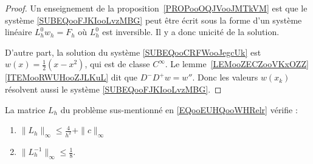\begin{proof}
    Un enseignement de la proposition~\ref{PROPooOQJVooJMTkVM} est que le système \eqref{SUBEQooFJKIooLvzMBG} peut être écrit sous la forme d'un système linéaire \( L^0_hw_h=F_h\) où \( L_h^0\) est inversible. Il y a donc unicité de la solution.

    D'autre part, la solution du système \eqref{SUBEQooCRFWooJegcUk} est \( w(x)=\frac{ 1 }{2}(x-x^2)\), qui est de classe \(  C^{\infty}\). Le lemme~\ref{LEMooZECZooVKxOZZ}\ref{ITEMooRWUHooZJLKuL} dit que \( D^-D^+w=w''\). Donc les valeurs \( w(x_k)\) résolvent aussi le système \eqref{SUBEQooFJKIooLvzMBG}.
\end{proof}

\begin{lemma}
    La matrice \( L_h\) du problème sus-mentionné en \eqref{EQooEUHQooWHRelr} vérifie :
    \begin{enumerate}
        \item
              \( \| L_h \|_{\infty}\leq \frac{4 }{ h^2 }+\| c \|_{\infty}\)
        \item
              \( \| L_h^{-1} \|_{\infty}\leq \frac{1}{ 8 }\).
    \end{enumerate}
\end{lemma}

